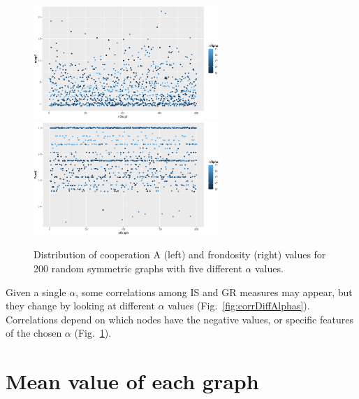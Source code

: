 \documentclass{article}
\begin{document}
\begin{figure}[htbp!]
  \centering{}
  \includegraphics[width=7cm]{img/coopDistS200A11to15}\quad\quad
  \includegraphics[width=7cm]{img/frondDistS200A11to15}
  \caption{Distribution of cooperation A (left) and frondosity (right)
    values for 200 random symmetric graphs with five different
    $\alpha$ values.} 
  \label{fig:coopDistS200A11to15}
\end{figure}

  Given a single $\alpha$, some correlations among IS and GR
  measures may appear, but they change by looking at different
  $\alpha$ values (Fig.~\ref{fig:corrDiffAlphas}). Correlations depend on
  which nodes have the negative values, or specific features of the
  chosen $\alpha$ (Fig.~\ref{fig:coopDistS200A11to15}). 

\section{Mean value of each graph}
\end{document}
